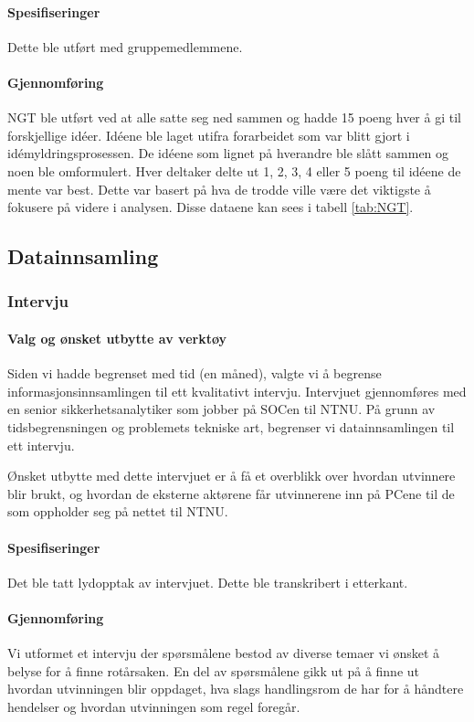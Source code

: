 \paragraph{Spesifiseringer}
Dette ble utført med gruppemedlemmene.

\paragraph{Gjennomføring}
NGT ble utført ved at alle satte seg ned sammen og hadde 15 poeng hver å gi til forskjellige idéer. Idéene ble laget utifra forarbeidet som var blitt gjort i idémyldringsprosessen. De idéene som lignet på hverandre ble slått sammen og noen ble omformulert. Hver deltaker delte ut 1, 2, 3, 4 eller 5 poeng til idéene de mente var best. Dette var basert på hva de trodde ville være det viktigste å fokusere på videre i analysen. Disse dataene kan sees i tabell \ref{tab:NGT}.

\subsection{Datainnsamling}
\subsubsection{Intervju}

\paragraph{Valg og ønsket utbytte av verktøy}
Siden vi hadde begrenset med tid (en måned), valgte vi å begrense informasjonsinnsamlingen til ett kvalitativt intervju. Intervjuet gjennomføres med en senior sikkerhetsanalytiker som jobber på SOCen til NTNU. På grunn av tidsbegrensningen og problemets tekniske art, begrenser vi datainnsamlingen til ett intervju.

Ønsket utbytte med dette intervjuet er å få et overblikk over hvordan utvinnere blir brukt, og hvordan de eksterne aktørene får utvinnerene inn på PCene til de som oppholder seg på nettet til NTNU.

\paragraph{Spesifiseringer}
Det ble tatt lydopptak av intervjuet. Dette ble transkribert i etterkant. 

\paragraph{Gjennomføring}
Vi utformet et intervju der spørsmålene bestod av diverse temaer vi ønsket å belyse for å finne rotårsaken. En del av spørsmålene gikk ut på å finne ut hvordan utvinningen blir oppdaget, hva slags handlingsrom de har for å håndtere hendelser og hvordan utvinningen som regel foregår.

